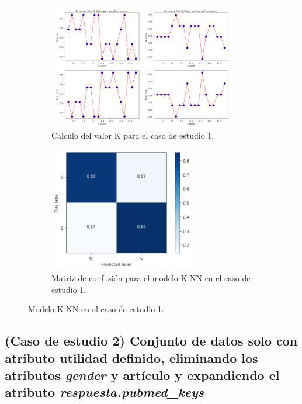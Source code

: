 \begin{figure}[!htb]
    \begin{subfigure}[b]{0.45\linewidth}
    	\centering
	    \includegraphics[width=0.9\textwidth]{images/resultados_knn_ent_conjunto1.png}
    	\caption{Calculo del valor K para el caso de estudio 1.}
		\label{knnTrainCase1}
	\end{subfigure}
	\begin{subfigure}[b]{0.45\linewidth} 
		\centering
		\includegraphics[width=0.7\textwidth]{images/resultados_knn_cm_conjunto1.png}
		\caption{Matriz de confusión para el modelo K-NN en el caso de estudio 1.}
		\label{knnCMCase1}
	\end{subfigure}
	\caption{Modelo K-NN en el caso de estudio 1.}
	\label{knnCase1}
\end{figure}

\subsection{(Caso de estudio 2) Conjunto de datos solo con atributo utilidad definido, eliminando los atributos \textit{gender} y artículo y expandiendo el atributo \textit{respuesta.pubmed\_keys}}

